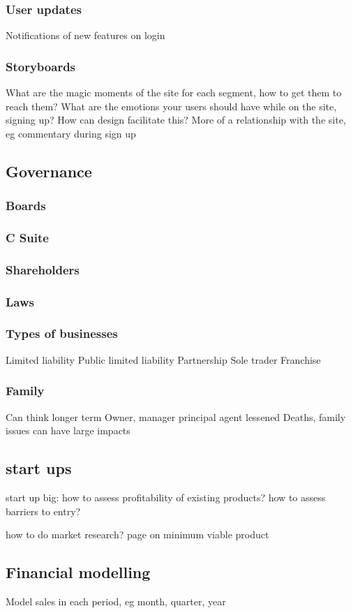 \subsubsection{User updates}
Notifications of new features on login

\subsubsection{Storyboards}
What are the magic moments of the site for each segment, how to get them to reach them?
What are the emotions your users should have while on the site, signing up? How can design facilitate this? More of a relationship with the site, eg commentary during sign up
\subsection{Governance}
\subsubsection{Boards}
\subsubsection{C Suite}
\subsubsection{Shareholders}
\subsubsection{Laws}
\subsubsection{Types of businesses}
Limited liability
Public limited liability
Partnership
Sole trader
Franchise
\subsubsection{Family}
Can think longer term
Owner, manager principal agent lessened
Deaths, family issues can have large impacts
\subsection{start ups}
start up big: how to assess profitability of existing products? how to assess barriers to entry?

how to do market research? page on minimum viable product
\subsection{Financial modelling}
Model sales in each period, eg month, quarter, year

